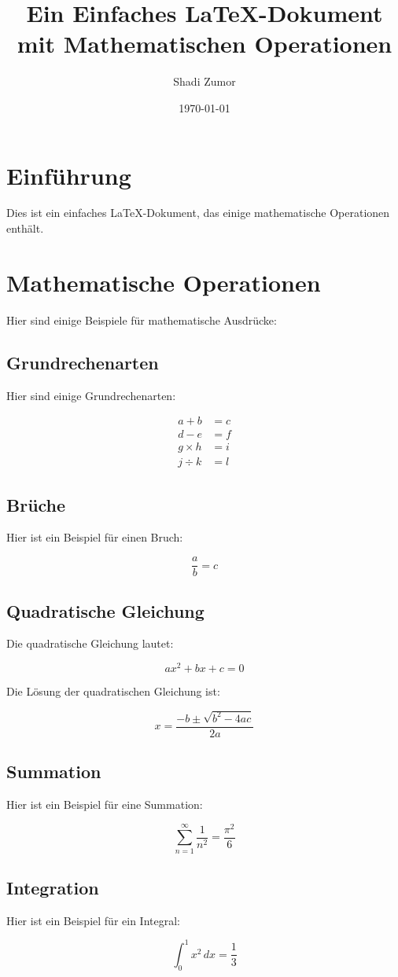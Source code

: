 \documentclass{article}
\begin{document}
\title{Ein Einfaches LaTeX-Dokument mit Mathematischen Operationen }
\author{Shadi Zumor}
\date{\today}
\maketitle

\section{Einführung}
Dies ist ein einfaches LaTeX-Dokument, das einige mathematische Operationen enthält.

\section{Mathematische Operationen}

Hier sind einige Beispiele für mathematische Ausdrücke:

\subsection{Grundrechenarten}
Hier sind einige Grundrechenarten:

\begin{align*}
a + b &= c \\
d - e &= f \\
g \times h &= i \\
j \div k &= l
\end{align*}

\subsection{Brüche}
Hier ist ein Beispiel für einen Bruch:

\begin{equation}
\frac{a}{b} = c
\end{equation}

\subsection{Quadratische Gleichung}
Die quadratische Gleichung lautet:

\begin{equation}
ax^2 + bx + c = 0
\end{equation}

Die Lösung der quadratischen Gleichung ist:

\begin{equation}
x = \frac{-b \pm \sqrt{b^2 - 4ac}}{2a}
\end{equation}

\subsection{Summation}
Hier ist ein Beispiel für eine Summation:

\begin{equation}
\sum_{n=1}^{\infty} \frac{1}{n^2} = \frac{\pi^2}{6}
\end{equation}

\subsection{Integration}
Hier ist ein Beispiel für ein Integral:

\begin{equation}
\int_{0}^{1} x^2 \, dx = \frac{1}{3}
\end{equation}
\end{document}
